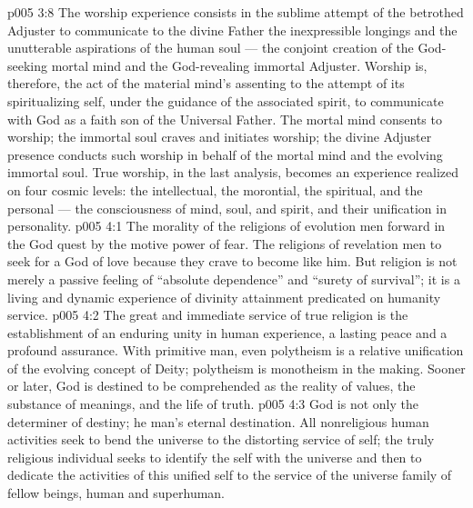\vs p005 3:8 The worship experience consists in the sublime attempt of the betrothed Adjuster to communicate to the divine Father the inexpressible longings and the unutterable aspirations of the human soul --- the conjoint creation of the God\hyp{}seeking mortal mind and the God\hyp{}revealing immortal Adjuster. Worship is, therefore, the act of the material mind’s assenting to the attempt of its spiritualizing self, under the guidance of the associated spirit, to communicate with God as a faith son of the Universal Father. The mortal mind consents to worship; the immortal soul craves and initiates worship; the divine Adjuster presence conducts such worship in behalf of the mortal mind and the evolving immortal soul. True worship, in the last analysis, becomes an experience realized on four cosmic levels: the intellectual, the morontial, the spiritual, and the personal --- the consciousness of mind, soul, and spirit, and their unification in personality.
\vs p005 4:1 The morality of the religions of evolution  men forward in the God quest by the motive power of fear. The religions of revelation  men to seek for a God of love because they crave to become like him. But religion is not merely a passive feeling of “absolute dependence” and “surety of survival”; it is a living and dynamic experience of divinity attainment predicated on humanity service.
\vs p005 4:2 The great and immediate service of true religion is the establishment of an enduring unity in human experience, a lasting peace and a profound assurance. With primitive man, even polytheism is a relative unification of the evolving concept of Deity; polytheism is monotheism in the making. Sooner or later, God is destined to be comprehended as the reality of values, the substance of meanings, and the life of truth.
\vs p005 4:3 God is not only the determiner of destiny; he  man’s eternal destination. All nonreligious human activities seek to bend the universe to the distorting service of self; the truly religious individual seeks to identify the self with the universe and then to dedicate the activities of this unified self to the service of the universe family of fellow beings, human and superhuman.
